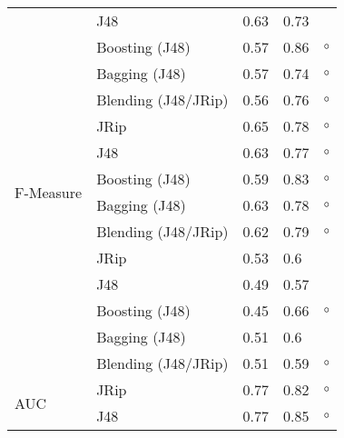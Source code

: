 \begin{table}[ph]
\begin{tabular}{@{}lllll@{}}
                           & J48                 & 0.63  & 0.73                                                    &         \\
                           & Boosting (J48)      & 0.57  & 0.86                                                    & $\circ$ \\
                           & Bagging  (J48)      & 0.57  & 0.74                                                    & $\circ$ \\
                           & Blending (J48/JRip) & 0.56  & 0.76                                                    & $\circ$ \\ \midrule
\multirow{6}{*}{F-Measure} & JRip                & 0.65  & 0.78                                                    & $\circ$ \\
                           & J48                 & 0.63  & 0.77                                                    & $\circ$ \\
                           & Boosting (J48)      & 0.59  & 0.83                                                    & $\circ$ \\
                           & Bagging  (J48)      & 0.63  & 0.78                                                    & $\circ$ \\
                           & Blending (J48/JRip) & 0.62  & 0.79                                                    & $\circ$ \\ \midrule
\multirow{6}{*}{Kappa}     & JRip                & 0.53  & 0.6                                                     &         \\
                           & J48                 & 0.49  & 0.57                                                    &         \\
                           & Boosting (J48)      & 0.45  & 0.66                                                    & $\circ$ \\
                           & Bagging  (J48)      & 0.51  & 0.6                                                     &         \\
                           & Blending (J48/JRip) & 0.51  & 0.59                                                    & $\circ$ \\ \midrule
\multirow{6}{*}{AUC}       & JRip                & 0.77  & 0.82                                                    & $\circ$ \\
                           & J48                 & 0.77  & 0.85                                                    & $\circ$ \\

\end{tabular}
\end{table}
